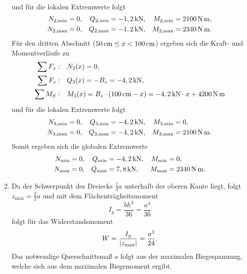 \documentclass{exercise}
\begin{document}
\begin{enumerate}
\begin{align*}
        \end{align*}
        und für die lokalen Extremwerte folgt
        \begin{align*}
            N_{2, \text{min}} &= 0, & Q_{2, \text{min}} &= -1,2\sis{\kilo\newton}, & M_{2, \text{min}} &= 2100\sis{\newton\meter},\\
            N_{2, \text{max}} &= 0, & Q_{2, \text{max}} &= -1,2\sis{\kilo\newton}, & M_{2, \text{max}} &= 2340\sis{\newton\meter}.
        \end{align*}
        Für den dritten Abschnitt (\(50\sis{\centi\meter} \le x < 100\sis{\centi\meter}\)) ergeben sich die Kraft- und Momentverläufe zu
        \begin{align*}
            \sum F_x: &\quad N_3\parentheses*{x} = 0,\\
            \sum F_z: &\quad Q_3\parentheses*{x} = -B_z = -4,2\sis{\kilo\newton},\\
            \sum M_S: &\quad M_3\parentheses*{x} = B_z \cdot \parentheses*{100\sis{\centi\meter} - x} = -4,2\sis{\kilo\newton} \cdot x + 4200\sis{\newton\meter}
        \end{align*}
        und für die lokalen Extremwerte folgt
        \begin{align*}
            N_{3, \text{min}} &= 0, & Q_{3, \text{min}} &= -4,2\sis{\kilo\newton}, & M_{3, \text{min}} &= 0,\\
            N_{3, \text{max}} &= 0, & Q_{3, \text{max}} &= -4,2\sis{\kilo\newton}, & M_{3, \text{max}} &= 2100\sis{\newton\meter}.
        \end{align*}
        Somit ergeben sich die globalen Extremwerte
        \begin{align*}
            N_{\text{min}} &= 0, & Q_{\text{min}} &= -4,2\sis{\kilo\newton}, & M_{\text{min}} &= 0,\\
            N_{\text{max}} &= 0, & Q_{\text{max}} &= 7,8\sis{\kilo\newton}, & M_{\text{max}} &= 2340\sis{\newton\meter}.
        \end{align*}
        \item Da der Schwerpunkt des Dreiecks \(\frac{1}{3}a\) unterhalb der oberen Kante liegt, folgt \(z_{\text{max}} = \frac{2}{3}a\) und mit dem Flächenträgheitsmoment
        \[
            I_y = \frac{bh^3}{36} = \frac{a^4}{36}
        \]
        folgt für das Widerstandsmoment
        \[
            W = \frac{I_y}{\absolute*{z_{\text{max}}}} = \frac{a^3}{24}.
        \]
        Das notwendige Querschnittsmaß \(a\) folgt aus der maximalen Biegespannung, welche sich aus dem maximalen Biegemoment ergibt.

\end{enumerate}
\end{document}
